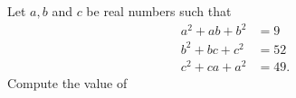 Let $a,b$ and $c$ be real numbers such that
\begin{align*}
a^2+ab+b^2&=9 \\
b^2+bc+c^2&=52 \\
c^2+ca+a^2&=49.
\end{align*}Compute the value of 